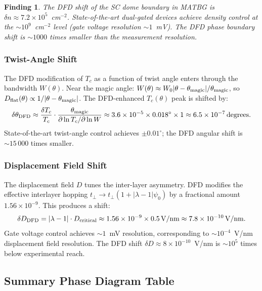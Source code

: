 \documentclass[11pt]{article}
\newtheorem{finding}{Finding}
\newcommand{\ee}[1]{\times 10^{#1}}
\newcommand{\tmagic}{\theta_{\rm magic}}
\newcommand{\lambdabound}{1.56\ee{-9}}
\begin{document}
\begin{finding}
  \label{find:phase_boundary}
  The DFD shift of the SC dome boundary in MATBG is
  $\delta n \approx 7.2\ee{5}$~cm$^{-2}$. State-of-the-art dual-gated
  devices achieve density control at the $\sim 10^9$~cm$^{-2}$ level
  (gate voltage resolution $\sim 1$~mV). The DFD phase boundary shift
  is $\sim 1000$ times smaller than the measurement resolution.
\end{finding}

\subsubsection{Twist-Angle Shift}

The DFD modification of $T_c$ as a function of twist angle enters through
the bandwidth $W(\theta)$. Near the magic angle:
$W(\theta) \approx W_0 |\theta - \tmagic|/\tmagic$, so
$D_{\rm flat}(\theta) \propto 1/|\theta - \tmagic|$. The DFD-enhanced
$T_c(\theta)$ peak is shifted by:
\begin{equation}
  \delta\theta_{\rm DFD} \approx \frac{\delta T_c}{T_c}
    \cdot \frac{\tmagic}{\partial\ln T_c/\partial\ln W}
    \approx 3.6\ee{-5} \times 0.018^\circ \times 1
    \approx 6.5\ee{-7}\,\text{degrees}.
  \label{eq:dtheta}
\end{equation}
State-of-the-art twist-angle control achieves $\pm 0.01^\circ$; the DFD
angular shift is $\sim 15\,000$ times smaller.

\subsubsection{Displacement Field Shift}

The displacement field $D$ tunes the inter-layer asymmetry. DFD modifies
the effective interlayer hopping $t_\perp \to t_\perp(1 + |\lambda-1|\psi_0)$
by a fractional amount $\lambdabound$. This produces a shift:
\begin{equation}
  \delta D_{\rm DFD} = |\lambda-1| \cdot D_{\rm critical}
    \approx \lambdabound \times 0.5\,\text{V/nm}
    \approx 7.8\ee{-10}\,\text{V/nm}.
  \label{eq:dD}
\end{equation}
Gate voltage control achieves $\sim 1$~mV resolution,
corresponding to $\sim 10^{-4}$~V/nm displacement field resolution.
The DFD shift $\delta D \approx 8\ee{-10}$~V/nm is $\sim 10^5$ times
below experimental reach.

\subsection{Summary Phase Diagram Table}
\end{document}
